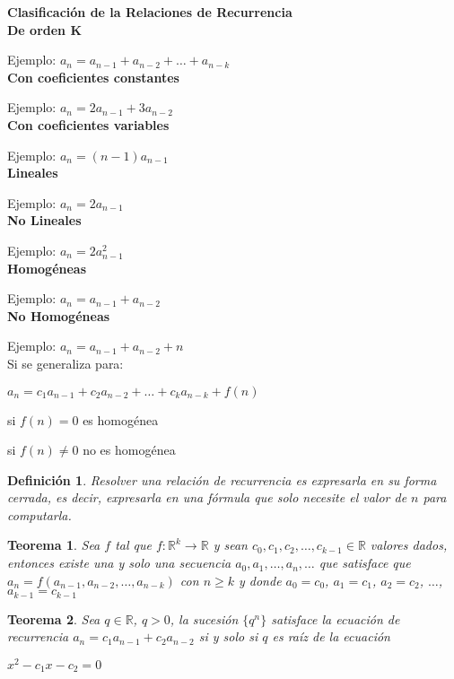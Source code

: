 \documentclass[a4paper,12pt]{report}
\newtheorem*{teo}{Teorema}
\newtheorem*{dfn}{Definición}
\begin{document}
\textbf{Clasificación de la Relaciones de Recurrencia}
 \\

 \textbf{De orden K}
 
 Ejemplo: $a_n=a_{n-1}+a_{n-2}+\dots+a_{n-k}$\\
 
  \textbf{Con coeficientes constantes}
  
  Ejemplo: $a_n=2a_{n-1}+3a_{n-2}$\\

  \textbf{Con coeficientes variables}
  
  Ejemplo: $a_n=(n-1)a_{n-1}$\\
  
  \textbf{Lineales}
  
  Ejemplo: $a_n=2a_{n-1}$\\
  
  \textbf{No Lineales}
  
  Ejemplo: $a_n=2a_{n-1}^2$\\
  
  \textbf{Homogéneas}
 
 Ejemplo: $a_n=a_{n-1}+a_{n-2}$\\
 
 \textbf{No Homogéneas}
 
 Ejemplo: $a_n=a_{n-1}+a_{n-2} + n$\\
 
 
 Si se generaliza para: 
 
 $a_n=c_1a_{n-1}+c_2a_{n-2}+\dots+c_ka_{n-k}+f(n)$
 
 si $f(n)=0$ es homogénea
 
 si $f(n)\neq 0$ no es homogénea
 
 
 \begin{dfn}
  Resolver una relación de recurrencia es expresarla en su forma cerrada, es decir, expresarla en una fórmula que solo necesite el valor de $n$ para computarla.
 \end{dfn}

 
 \begin{teo}
  Sea $f$ tal que $f:\mathbb{R}^k\rightarrow \mathbb{R}$ y sean $c_0,c_1,c_2,\dots,c_{k-1}\in\mathbb{R}$ valores dados, entonces existe una y solo una secuencia $a_0,a_1,\dots,a_n,\dots$ que satisface que $a_n=f(a_{n-1},a_{n-2},\dots,a_{n-k})$ con $n\geq k$ y donde $a_0=c_0$, $a_1=c_1$, $a_2=c_2$, $\dots$, $a_{k-1}=c_{k-1}$
 \end{teo}

 \begin{teo}
  Sea $q\in \mathbb{R}$, $q>0$, la sucesión $\{q^n\}$ satisface la ecuación de recurrencia $a_n=c_1a_{n-1}+c_2a_{n-2}$ si y solo si $q$ es raíz de la ecuación 
  
  $x^2-c_1x-c_2=0$
 \end{teo}
 
\end{document}

